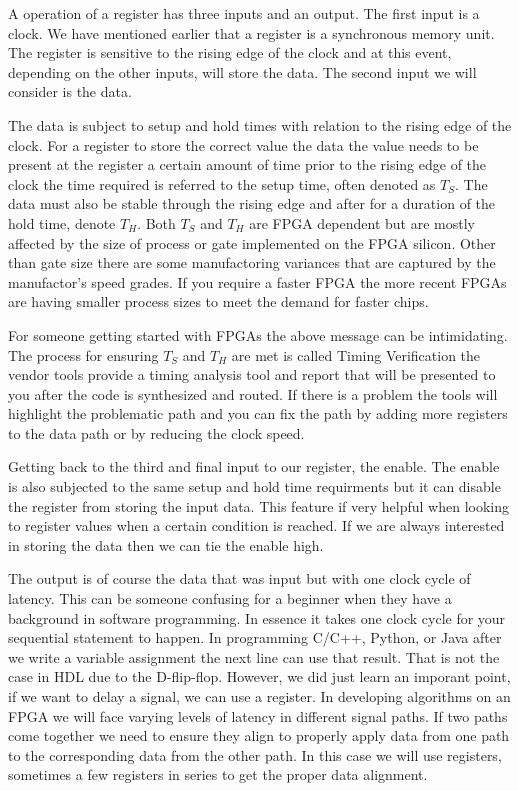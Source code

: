 A operation of a register has three inputs and an output. The first input is a clock. We have mentioned earlier that a register is a synchronous memory unit. The register is sensitive to the rising edge of the clock and at this event, depending on the other inputs, will store the data. The second input we will consider is the data. 

The data is subject to setup and hold times with relation to the rising edge of the clock. For a register to store the correct value the data the value needs to be present at the register a certain amount of time prior to the rising edge of the clock the time required is referred to the setup time, often denoted as $T_S$. The data must also be stable through the rising edge and after for a duration of the hold time, denote $T_H$. Both $T_S$ and $T_H$ are \ac{FPGA} dependent but are mostly affected by the size of process or gate implemented on the \ac{FPGA} silicon. Other than gate size there are some manufactoring variances that are captured by the manufactor's speed grades. If you require a faster \ac{FPGA} the more recent \ac{FPGA}s are having smaller process sizes to meet the demand for faster chips. 

For someone getting started with \ac{FPGA}s the above message can be intimidating. The process for ensuring $T_S$ and $T_H$ are met is called \ac{Timing Verification} the vendor tools provide a timing analysis tool and report that will be presented to you after the code is synthesized and routed. If there is a problem the tools will highlight the problematic path and you can fix the path by adding more registers to the data path or by reducing the clock speed. 

Getting back to the third and final input to our register, the enable. The enable is also subjected to the same setup and hold time requirments but it can disable the register from storing the input data. This feature if very helpful when looking to register values when a certain condition is reached. If we are always interested in storing the data then we can tie the enable high.

The output is of course the data that was input but with one clock cycle of latency. This can be someone confusing for a beginner when they have a background in software programming. In essence it takes one clock cycle for your sequential statement to happen. In programming C/C++, Python, or Java after we write a variable assignment the next line can use that result. That is not the case in \ac{HDL} due to the D-flip-flop. However, we did just learn an imporant point, if we want to delay a signal, we can use a register. In developing algorithms on an \ac{FPGA} we will face varying levels of latency in different signal paths. If two paths come together we need to ensure they align to properly apply data from one path to the corresponding data from the other path. In this case we will use registers, sometimes a few registers in series to get the proper data alignment. 

